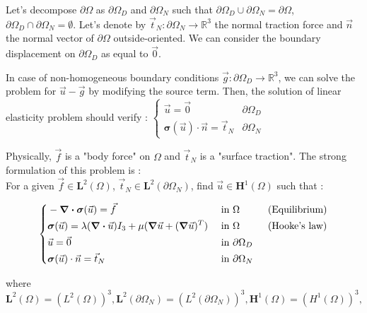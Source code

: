 \documentclass[a4paper,12pt,twoside]{report}
\newcommand{\mtr}{\mathbb{R}}
\begin{document}
Let's decompose $\partial \Omega$ as $\partial \Omega_D$ and $\partial \Omega_N$ such that $\partial \Omega_D \cup \partial \Omega_N = \partial \Omega$, $\partial \Omega_D \cap \partial \Omega_N = \emptyset$. Let's denote by $\vec t_N : \partial \Omega_N \rightarrow \mtr^3$ the normal traction force and $\vec n$ the normal vector of $\partial \Omega$ outside-oriented. We can consider the boundary displacement on $\partial \Omega_D$ as equal to $\vec 0$. 

In case of non-homogeneous boundary conditions $\vec g : \partial \Omega_D \rightarrow \mtr^3$, we can solve the problem for $\vec u - \vec g$ by modifying the source term. Then, the solution of linear elasticity problem should verify :
$
\left\{ \begin{array}{ll}
\vec u = \vec 0 & \partial \Omega_D \\
\boldsymbol{\sigma} (\vec u) \cdot \vec n = \vec t_N & \partial \Omega_N
\end{array} \right.
$

Physically, $\vec f$ is a "body force" on $\Omega$ and $\vec t_N$ is a "surface traction". 
The strong formulation of this problem is : \\
For a given $\vec f \in \boldsymbol L^2(\Omega)$, $\vec t_N \in \boldsymbol L^2(\partial \Omega_N)$, find $\vec u \in \boldsymbol H^1(\Omega)$ such that : 

\begin{tcolorbox}
\begin{equation}
\label{eq:strong_form}
\left\{
\begin{aligned}
    & - \div \boldsymbol{\sigma} (\vec u) = \vec f & \text{ in } & \Omega \hspace{1cm} \text{(Equilibrium)}\\
    & \boldsymbol{\sigma} (\vec u) = \lambda (\div \vec u) I_3 + \mu (\grad \vec u + (\grad \vec u)^T) & \text{ in }& \Omega \hspace{1cm} \text{(Hooke's law)} \\
    & \vec u = \vec 0 & \text{ in } &\partial \Omega_D \\
    & \boldsymbol{\sigma} (\vec u) \cdot \vec n = \vec t_N & \text{ in }& \partial \Omega_N
\end{aligned}
\right.
\end{equation}
\end{tcolorbox}

where $\boldsymbol L^2(\Omega) = \left(L^2(\Omega) \right)^3, \boldsymbol L^2(\partial \Omega_N) = \left(L^2(\partial \Omega_N) \right)^3, \boldsymbol H^1(\Omega) = \left(H^1(\Omega) \right)^3, $
\end{document}
